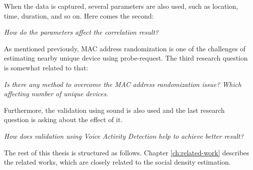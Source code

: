 When the data is captured, several parameters are also used, such as location, time, duration, and so on. Here comes the second:
\begin{displayquote}\textit{
How do the parameters affect the correlation result?}
\end{displayquote}

As mentioned previously, MAC address randomization is one of the challenges of estimating nearby unique device using probe-request. The third research question is somewhat related to that:
\begin{displayquote}\textit{
Is there any method to overcome the MAC address randomization issue? Which affecting number of unique devices.}
\end{displayquote}

Furthermore, the validation using sound is also used and the last research question is asking about the effect of it.
\begin{displayquote}\textit{
How does validation using Voice Activity Detection help to achieve better result?}
\end{displayquote}

The rest of this thesis is structured as follows. Chapter \ref{ch:related-work} describes the related works, which are closely related to the social density estimation.






